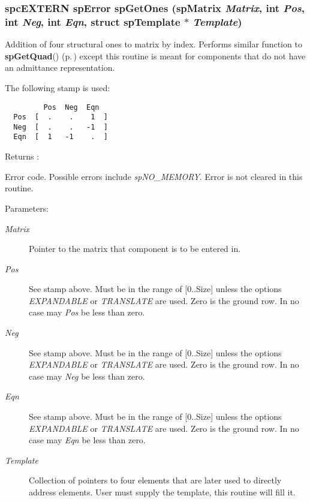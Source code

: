 \subsubsection{\setlength{\rightskip}{0pt plus 5cm}spc\-EXTERN {\bf sp\-Error} sp\-Get\-Ones ({\bf sp\-Matrix} {\em Matrix}, int {\em Pos}, int {\em Neg}, int {\em Eqn}, struct {\bf sp\-Template} $\ast$ {\em Template})}\label{spMatrix_8h_a38}


Addition of four structural ones to matrix by index. Performs similar function to {\bf sp\-Get\-Quad}() {\rm (p.\,\pageref{spMatrix_8h_a39})} except this routine is meant for components that do not have an admittance representation.

The following stamp is used: 

\footnotesize\begin{verbatim}         Pos  Neg  Eqn
  Pos  [  .    .    1  ]
  Neg  [  .    .   -1  ]
  Eqn  [  1   -1    .  ]
\end{verbatim}\normalsize 


\begin{Desc}
\item[Returns :]\par
 Error code. Possible errors include {\em sp\-NO\_\-MEMORY}. Error is not cleared in this routine.\end{Desc}
\begin{Desc}
\item[Parameters: ]\par
\begin{description}
\item[{\em 
Matrix}]Pointer to the matrix that component is to be entered in. \item[{\em 
Pos}]See stamp above. Must be in the range of [0..Size] unless the options {\em EXPANDABLE} or {\em TRANSLATE} are used. Zero is the ground row. In no case may {\em Pos} be less than zero. \item[{\em 
Neg}]See stamp above. Must be in the range of [0..Size] unless the options {\em EXPANDABLE} or {\em TRANSLATE} are used. Zero is the ground row. In no case may {\em Neg} be less than zero. \item[{\em 
Eqn}]See stamp above. Must be in the range of [0..Size] unless the options {\em EXPANDABLE} or {\em TRANSLATE} are used. Zero is the ground row. In no case may {\em Eqn} be less than zero. \item[{\em 
Template}]Collection of pointers to four elements that are later used to directly address elements. User must supply the template, this routine will fill it. \end{description}
\end{Desc}
